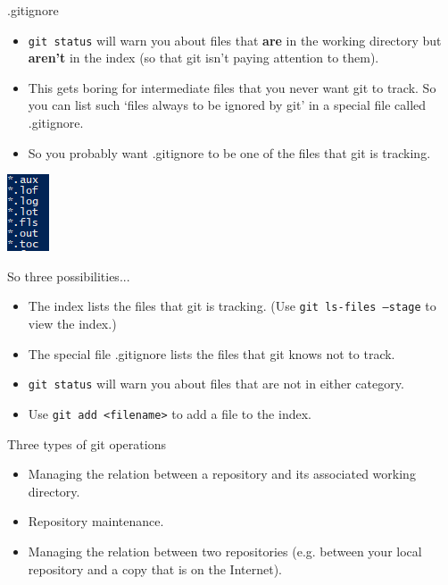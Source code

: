 \documentclass[usenames,dvipsnames]{beamer}
\newcommand{\code}[1]{\colorbox{light-gray}{\texttt{#1}}}
\begin{document}
\begin{frame}{.gitignore}
  \begin{block}{}
    \begin{itemize}
      \item{\code{git status} will warn you about files that \textbf{are} in the working directory but \textbf{aren't} in the index (so that git isn't paying attention to them).}
      \item{This gets boring for intermediate files that you never want git to track. So you can list such `files always to be ignored by git' in a special file called .gitignore.}
      \item{So you probably want .gitignore to be one of the files that git is tracking.}
    \end{itemize}
  \end{block}
  \begin{block}{}
    \begin{center}
      \includegraphics[scale=0.8]{gitignore.png}
    \end{center}
  \end{block}
\end{frame}

\begin{frame}{So three possibilities...}
  \begin{block}{}
    \begin{itemize}
      \item{The index lists the files that git is tracking. (Use \code{git ls-files --stage} to view the index.)}
      \item{The special file .gitignore lists the files that git knows not to track.}
      \item{\code{git status} will warn you about files that are not in either category.}
      \item{Use \code{git add <filename>} to add a file to the index.}
    \end{itemize}
  \end{block}
\end{frame}


\begin{frame}{Three types of git operations}
  \begin{block}{}
    \begin{itemize}
      \item{Managing the relation between a repository and its associated working directory.}
      \item{Repository maintenance.}
      \item{Managing the relation between two repositories (e.g. between your local repository and a copy that is on the Internet).}
    \end{itemize}
  \end{block}
\end{frame}
\end{document}
